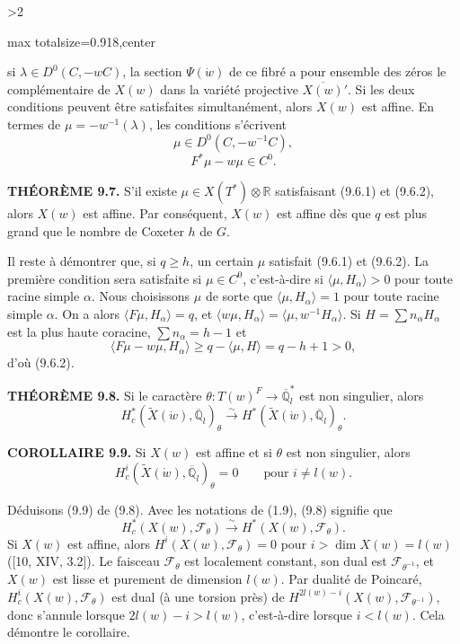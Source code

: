 \documentclass[9pt,twoside]{extarticle}
\newcommand{\EditionPage}[3]{%
  \ifnum#1>2\clearpage\fi
  \pdfbookmark[1]{Printed page #2}{fr-folio-#2}%
  \hypertarget{fr-physical-#1}{}%
  \noindent\begin{adjustbox}{max totalsize={\textwidth}{0.918\textheight},center}
  \begin{minipage}[t]{\textwidth}
  \fontsize{9.4}{11.1}\selectfont\justifying
  #3
  \end{minipage}
  \end{adjustbox}%
}
\begin{document}
\EditionPage{49}{150}{%
si \(\lambda\in D^0(C,-wC)\), la section \(\Psi(\dot w)\) de ce fibré a pour ensemble des zéros le complémentaire de \(X(w)\) dans la variété projective \(\overline{X(w)}'\). Si les deux conditions peuvent être satisfaites simultanément, alors \(X(w)\) est affine. En termes de \(\mu=-w^{-1}(\lambda)\), les conditions s'écrivent \[
\tag{9.6.1}
\mu\in D^0(C,-w^{-1}C),
\]  \[
\tag{9.6.2}
F^*\mu-w\mu\in C^0.
\]\par

\noindent\textbf{THÉORÈME 9.7.} S'il existe \(\mu\in X(T^*)\otimes\mathbb R\) satisfaisant (9.6.1) et (9.6.2), alors \(X(w)\) est affine. Par conséquent, \(X(w)\) est affine dès que \(q\) est plus grand que le nombre de Coxeter \(h\) de \(G\).\par

Il reste à démontrer que, si \(q\ge h\), un certain \(\mu\) satisfait (9.6.1) et (9.6.2). La première condition sera satisfaite si \(\mu\in C^0\), c'est-à-dire si \(\langle\mu,H_\alpha\rangle>0\) pour toute racine simple \(\alpha\). Nous choisissons \(\mu\) de sorte que \(\langle\mu,H_\alpha\rangle=1\) pour toute racine simple \(\alpha\). On a alors \(\langle F\mu,H_\alpha\rangle=q\), et \(\langle w\mu,H_\alpha\rangle=\langle\mu,w^{-1}H_\alpha\rangle\). Si \(H=\sum n_\alpha H_\alpha\) est la plus haute coracine, \(\sum n_\alpha=h-1\) et \[
\langle F\mu-w\mu,H_\alpha\rangle
\ge q-\langle\mu,H\rangle
=q-h+1>0,
\] d'où (9.6.2).\par

\noindent\textbf{THÉORÈME 9.8.} Si le caractère \(\theta:T(w)^F\to\overline{\mathbb Q}_l^*\) est non singulier, alors \[
H_c^*(\widetilde X(\dot w),\overline{\mathbb Q}_l)_\theta
\xrightarrow{\sim}
H^*(\widetilde X(\dot w),\overline{\mathbb Q}_l)_\theta.
\]\par

\noindent\textbf{COROLLAIRE 9.9.} Si \(X(w)\) est affine et si \(\theta\) est non singulier, alors \[
H_c^i(\widetilde X(\dot w),\overline{\mathbb Q}_l)_\theta=0
\qquad\text{pour }i\ne l(w).
\]\par

Déduisons (9.9) de (9.8). Avec les notations de (1.9), (9.8) signifie que \[
\tag{9.9.1}
H_c^*(X(w),\mathcal F_\theta)
\xrightarrow{\sim}
H^*(X(w),\mathcal F_\theta).
\] Si \(X(w)\) est affine, alors \(H^i(X(w),\mathcal F_\theta)=0\) pour \(i>\dim X(w)=l(w)\) ([10, XIV, 3.2]). Le faisceau \(\mathcal F_\theta\) est localement constant, son dual est \(\mathcal F_{\theta^{-1}}\), et \(X(w)\) est lisse et purement de dimension \(l(w)\). Par dualité de Poincaré, \(H_c^i(X(w),\mathcal F_\theta)\) est dual (à une torsion près) de \(H^{2l(w)-i}(X(w),\mathcal F_{\theta^{-1}})\), donc s'annule lorsque \(2l(w)-i>l(w)\), c'est-à-dire lorsque \(i<l(w)\). Cela démontre le corollaire.\par

}
\end{document}
